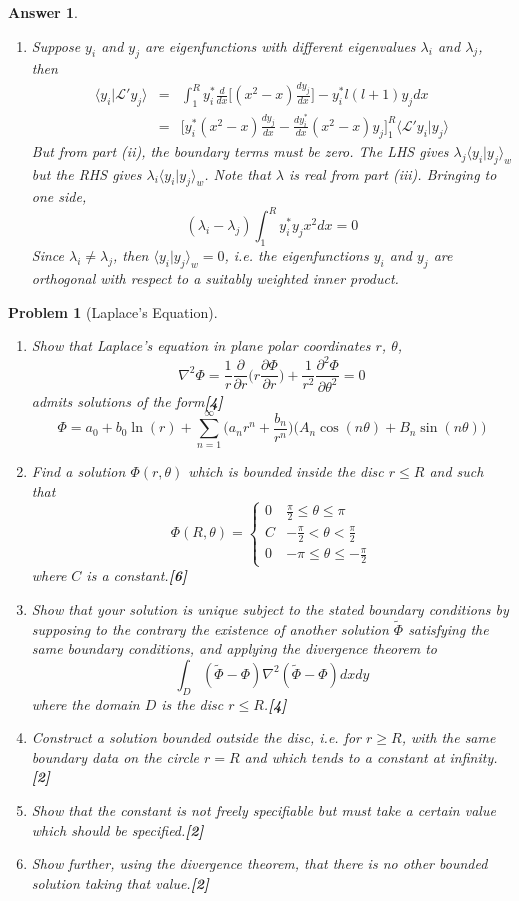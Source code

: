 \documentclass[a4paper]{article}
\newtheorem{ans}{Answer}[section]
\theoremstyle{new}
\newtheorem{qns}{Problem}[section]
\begin{document}
\begin{ans}
\begin{enumerate}[label=(\roman*)]
\item Suppose $y_i$ and $y_j$ are eigenfunctions with different eigenvalues $\lambda_i$ and $\lambda_j$, then 
\begin{eqnarray}
\langle y_i|\mathcal{L}'y_j\rangle&=&\int_1^Ry_i^*\frac{d}{dx}\bigg[(x^2-x)\frac{dy_j}{dx}\bigg]-y_i^*l(l+1)y_jdx\nonumber\\&=&\bigg[y_i^*(x^2-x)\frac{dy_j}{dx}-\frac{dy_i^*}{dx}(x^2-x)y_j\bigg]_1^R\langle\mathcal{L}'y_i|y_j\rangle\nonumber
\end{eqnarray}
But from part (ii), the boundary terms must be zero. The LHS gives $\lambda_j\langle y_i|y_j\rangle_w$ but the RHS gives $\lambda_i\langle y_i|y_j\rangle_w$. Note that $\lambda$ is real from part (iii). Bringing to one side,
$$(\lambda_i-\lambda_j)\int_1^Ry_i^*y_jx^2dx=0$$
Since $\lambda_i\neq\lambda_j$, then $\langle y_i|y_j\rangle_w=0$, i.e. the eigenfunctions $y_i$ and $y_j$ are orthogonal with respect to a suitably weighted inner product.
\end{enumerate}
\end{ans}
\begin{qns}[Laplace's Equation]\leavevmode
\begin{enumerate}[label=(\roman*)]
    \item Show that Laplace’s equation in plane polar coordinates $r$, $\theta$,
$$\nabla^2\Phi=\frac{1}{r}\frac{\partial}{\partial r}\bigg(r\frac{\partial\Phi}{\partial r}\bigg)+\frac{1}{r^2}\frac{\partial^2\Phi}{\partial\theta^2}=0$$
admits solutions of the form\hfill\textbf{[4]}
$$\Phi=a_0+b_0\ln(r)+\sum_{n=1}^\infty\bigg(a_nr^n+\frac{b_n}{r^n}\bigg)\bigg(A_n\cos(n\theta)+B_n\sin(n\theta)\bigg)$$
\item Find a solution $\Phi(r, \theta)$ which is bounded inside the disc $r\leq R$ and such that 
$$\Phi(R,\theta)=
\left\{
        \begin{array}{ll}
      0 & \frac{\pi}{2}\leq\theta\leq\pi \\
      C & -\frac{\pi}{2}<\theta<\frac{\pi}{2}\\
      0 & -\pi\leq\theta\leq-\frac{\pi}{2}
        \end{array}
    \right.$$
where $C$ is a constant.\hfill\textbf{[6]}
\item Show that your solution is unique subject to the stated boundary conditions by supposing to the contrary the existence of another solution $\tilde{\Phi}$ satisfying the same boundary conditions, and applying the divergence theorem to
$$\int_D(\tilde{\Phi}-\Phi)\nabla^2(\tilde{\Phi}-\Phi)dxdy$$
where the domain $D$ is the disc $r\leq R$.\hfill\textbf{[4]}
\item Construct a solution bounded outside the disc, i.e. for $r \geq R$, with the same boundary data on the circle $r = R$ and which tends to a constant at infinity.\hfill\textbf{[2]}
\item Show that the constant is not freely specifiable but must take a certain value which should be specified.\hfill\textbf{[2]}
\item Show further, using the divergence theorem, that there is no other bounded solution taking that value.\hfill\textbf{[2]}
\end{enumerate}
\end{qns}
\end{document}
